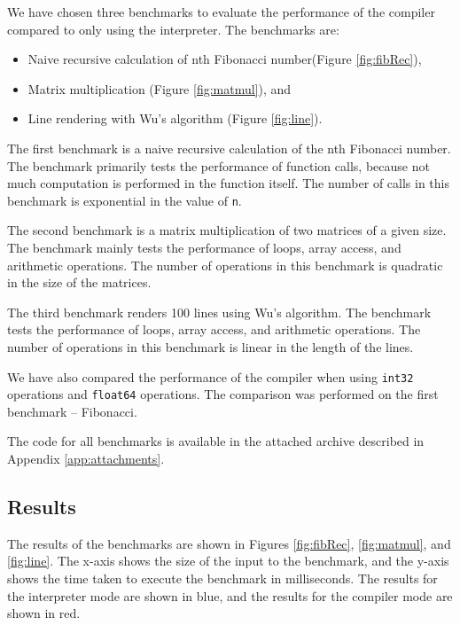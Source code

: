 We have chosen three benchmarks to evaluate the performance of the compiler compared to only using the interpreter. The benchmarks are:
\begin{itemize}
    \item Naive recursive calculation of nth Fibonacci number(Figure \ref{fig:fibRec}),
    \item Matrix multiplication (Figure \ref{fig:matmul}), and
    \item Line rendering with Wu's algorithm (Figure \ref{fig:line}).
\end{itemize}

The first benchmark is a naive recursive calculation of the nth Fibonacci number. The benchmark primarily tests the performance of function calls, because not much computation is performed in the function itself. The number of calls in this benchmark is exponential in the value of \texttt{n}.

The second benchmark is a matrix multiplication of two matrices of a given size. The benchmark mainly tests the performance of loops, array access, and arithmetic operations. The number of operations in this benchmark is quadratic in the size of the matrices.

The third benchmark renders 100 lines using Wu's algorithm\cite{wu}. The benchmark tests the performance of loops, array access, and arithmetic operations. The number of operations in this benchmark is linear in the length of the lines.

We have also compared the performance of the compiler when using \texttt{int32} operations and \texttt{float64} operations. The comparison was performed on the first benchmark -- Fibonacci.

The code for all benchmarks is available in the attached archive described in Appendix \ref{app:attachments}.


\subsection{Results}

The results of the benchmarks are shown in Figures \ref{fig:fibRec}, \ref{fig:matmul}, and \ref{fig:line}. The x-axis shows the size of the input to the benchmark, and the y-axis shows the time taken to execute the benchmark in milliseconds. The results for the interpreter mode are shown in blue, and the results for the compiler mode are shown in red.

